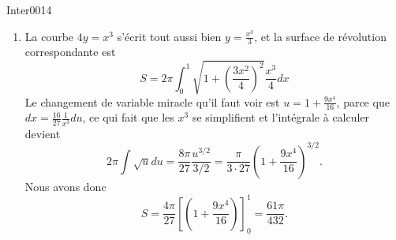 \begin{corrige}{Inter0014}

\begin{enumerate}

\item


La courbe $4y=x^3$ s'écrit tout aussi bien $y=\frac{ x^3 }{ 3 }$, et la surface de révolution correspondante est
\begin{equation}
	S=2\pi\int_0^1\sqrt{1+\left( \frac{ 3x^2 }{ 4 } \right)^2}\frac{ x^3 }{ 4 }dx
\end{equation}
Le changement de variable miracle qu'il faut voir est $u=1+\frac{ 9x^4 }{ 16 }$, parce que $dx=\frac{ 16 }{ 27 }\frac{1}{ x^3 }du$, ce qui fait que les $x^3$ se simplifient et l'intégrale à calculer devient
\begin{equation}
	2\pi\int\sqrt{u}du=\frac{ 8\pi }{ 27 }\frac{ u^{3/2} }{ 3/2 }=\frac{\pi}{ 3\cdot 27 }\left( 1+\frac{ 9x^4 }{ 16 } \right)^{3/2}.
\end{equation}
Nous avons donc
\begin{equation}
	S=\frac{ 4\pi }{ 27 }\left[ \left( 1+\frac{ 9x^{4} }{ 16 } \right) \right]_0^1=\frac{ 61\pi }{ 432 }.
\end{equation}


\end{enumerate}
\end{corrige}
